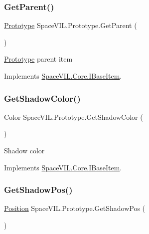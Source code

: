 \subsubsection{\texorpdfstring{Get\+Parent()}{GetParent()}}
{\footnotesize\ttfamily \mbox{\hyperlink{class_space_v_i_l_1_1_prototype}{Prototype}} Space\+V\+I\+L.\+Prototype.\+Get\+Parent (\begin{DoxyParamCaption}{ }\end{DoxyParamCaption})}



\mbox{\hyperlink{class_space_v_i_l_1_1_prototype}{Prototype}} parent item 



Implements \mbox{\hyperlink{interface_space_v_i_l_1_1_core_1_1_i_base_item}{Space\+V\+I\+L.\+Core.\+I\+Base\+Item}}.

\mbox{\label{class_space_v_i_l_1_1_prototype_add10105022c0f37835efb3efbd74ad26}} 
\subsubsection{\texorpdfstring{Get\+Shadow\+Color()}{GetShadowColor()}}
{\footnotesize\ttfamily Color Space\+V\+I\+L.\+Prototype.\+Get\+Shadow\+Color (\begin{DoxyParamCaption}{ }\end{DoxyParamCaption})}



Shadow color 



Implements \mbox{\hyperlink{interface_space_v_i_l_1_1_core_1_1_i_base_item}{Space\+V\+I\+L.\+Core.\+I\+Base\+Item}}.

\mbox{\label{class_space_v_i_l_1_1_prototype_a42554735fe0d8e87111757ccbf96d0e9}} 
\subsubsection{\texorpdfstring{Get\+Shadow\+Pos()}{GetShadowPos()}}
{\footnotesize\ttfamily \mbox{\hyperlink{class_space_v_i_l_1_1_core_1_1_position}{Position}} Space\+V\+I\+L.\+Prototype.\+Get\+Shadow\+Pos (\begin{DoxyParamCaption}{ }\end{DoxyParamCaption})}



